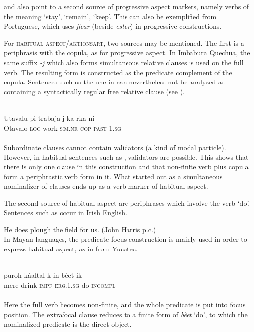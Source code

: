\citet[§~5]{Givón1973} and \citet[124-126]{HeineEtAl1984} also point to a second source of progressive aspect markers, namely verbs of the meaning ‘stay’, ‘remain’, ‘keep’. This can also be exemplified from Portuguese, which uses \textit{ficar} (beside \textit{estar}) in progressive constructions.

\label{page33b}For \textsc{habitual aspect/aktionsart}, two sources may be mentioned. The first is a periphrasis with the copula, as for progressive aspect. In Imbabura Quechua, the same suffix \textit{{}-j} which also forms simultaneous relative clauses is used on the full verb. The resulting form is constructed as the predicate complement of the copula. Sentences such as the one in  can nevertheless not be analyzed as containing a syntactically regular free relative clause (see \citet[149]{Cole1982}).

\ea\label{ex:E4}
\\
\gll Utavalu-pi  trabaja-j  ka-rka-ni\\
Otavalo-\textsc{loc}  work-\textsc{sim}.\textsc{nr}  \textsc{cop}-\textsc{past}-1.\textsc{sg}\\
\\
\z
\noindent Subordinate clauses cannot contain validators (a kind of modal particle). However, in habitual sentences such as , validators are possible. This shows that there is only one clause in this construction and that non-finite verb plus copula form a periphrastic verb form in it. What started out as a simultaneous nominalizer of clauses ends up as a verb marker of habitual aspect.\label{page34}

The second source of habitual aspect are periphrases which involve the verb ‘do’. Sentences such as  occur in Irish English.

\ea\label{ex:E5} He does plough the field for us. (John Harris p.c.)\\
\z
\noindent In Mayan languages, the predicate focus construction is mainly used in order to express habitual aspect, as in  from Yucatec.

\ea\label{ex:E6}
\\
\gll puroh  káaltal  k-in  bèet-ik\\
 mere  drink  \textsc{impf}-\textsc{erg}.1.\textsc{sg}  do-\textsc{incompl}\\
\\
\z
\noindent Here the full verb becomes non-finite, and the whole predicate is put into focus position. The extrafocal clause reduces to a finite form of \textit{bèet} ‘do’, to which the nominalized predicate is the direct object.

